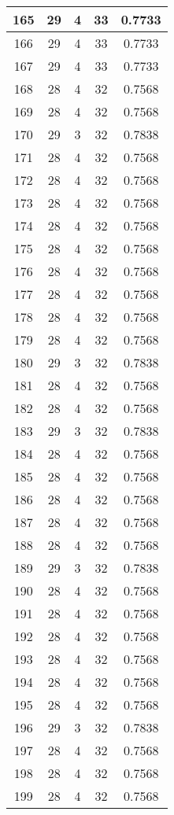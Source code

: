 \documentclass[letterpaper, 12pt]{article}
\begin{document}
\begin{longtable}{|c|c|c|c|c|}
\hline
165 & 29 & 4 & 33 & 0.7733 \\
\hline
166 & 29 & 4 & 33 & 0.7733 \\
\hline
167 & 29 & 4 & 33 & 0.7733 \\
\hline
168 & 28 & 4 & 32 & 0.7568 \\
\hline
169 & 28 & 4 & 32 & 0.7568 \\
\hline
170 & 29 & 3 & 32 & 0.7838 \\
\hline
171 & 28 & 4 & 32 & 0.7568 \\
\hline
172 & 28 & 4 & 32 & 0.7568 \\
\hline
173 & 28 & 4 & 32 & 0.7568 \\
\hline
174 & 28 & 4 & 32 & 0.7568 \\
\hline
175 & 28 & 4 & 32 & 0.7568 \\
\hline
176 & 28 & 4 & 32 & 0.7568 \\
\hline
177 & 28 & 4 & 32 & 0.7568 \\
\hline
178 & 28 & 4 & 32 & 0.7568 \\
\hline
179 & 28 & 4 & 32 & 0.7568 \\
\hline
180 & 29 & 3 & 32 & 0.7838 \\
\hline
181 & 28 & 4 & 32 & 0.7568 \\
\hline
182 & 28 & 4 & 32 & 0.7568 \\
\hline
183 & 29 & 3 & 32 & 0.7838 \\
\hline
184 & 28 & 4 & 32 & 0.7568 \\
\hline
185 & 28 & 4 & 32 & 0.7568 \\
\hline
186 & 28 & 4 & 32 & 0.7568 \\
\hline
187 & 28 & 4 & 32 & 0.7568 \\
\hline
188 & 28 & 4 & 32 & 0.7568 \\
\hline
189 & 29 & 3 & 32 & 0.7838 \\
\hline
190 & 28 & 4 & 32 & 0.7568 \\
\hline
191 & 28 & 4 & 32 & 0.7568 \\
\hline
192 & 28 & 4 & 32 & 0.7568 \\
\hline
193 & 28 & 4 & 32 & 0.7568 \\
\hline
194 & 28 & 4 & 32 & 0.7568 \\
\hline
195 & 28 & 4 & 32 & 0.7568 \\
\hline
196 & 29 & 3 & 32 & 0.7838 \\
\hline
197 & 28 & 4 & 32 & 0.7568 \\
\hline
198 & 28 & 4 & 32 & 0.7568 \\
\hline
199 & 28 & 4 & 32 & 0.7568 \\
\hline
\end{longtable}
\end{document}
